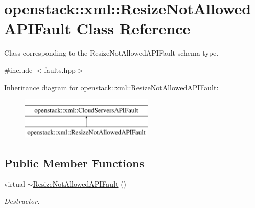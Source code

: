\hypertarget{classopenstack_1_1xml_1_1ResizeNotAllowedAPIFault}{
\section{openstack::xml::ResizeNotAllowedAPIFault Class Reference}
\label{classopenstack_1_1xml_1_1ResizeNotAllowedAPIFault}
}


Class corresponding to the ResizeNotAllowedAPIFault schema type.  




{\ttfamily \#include $<$faults.hpp$>$}

Inheritance diagram for openstack::xml::ResizeNotAllowedAPIFault:\begin{figure}[H]
\begin{center}
\leavevmode
\includegraphics[height=2.000000cm]{classopenstack_1_1xml_1_1ResizeNotAllowedAPIFault}
\end{center}
\end{figure}
\subsection*{Public Member Functions}
\begin{DoxyCompactItemize}
\item 
\hypertarget{classopenstack_1_1xml_1_1ResizeNotAllowedAPIFault_a4851a8c8a77d8ad57b9d78a21758c158}{
virtual \hyperlink{classopenstack_1_1xml_1_1ResizeNotAllowedAPIFault_a4851a8c8a77d8ad57b9d78a21758c158}{$\sim$ResizeNotAllowedAPIFault} ()}
\label{classopenstack_1_1xml_1_1ResizeNotAllowedAPIFault_a4851a8c8a77d8ad57b9d78a21758c158}

\begin{DoxyCompactList}\small\item\em Destructor. \item\end{DoxyCompactList}\end{DoxyCompactItemize}
